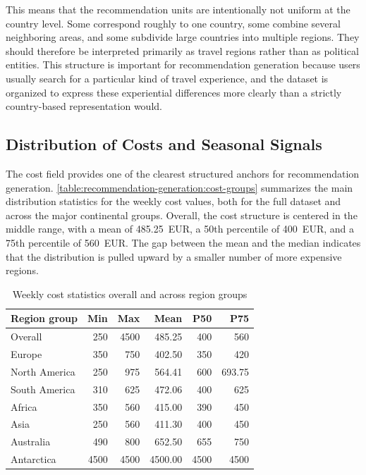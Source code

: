 This means that the recommendation units are intentionally not uniform at the country level. Some correspond roughly to one country, some combine several neighboring areas, and some subdivide large countries into multiple regions. They should therefore be interpreted primarily as travel regions rather than as political entities. This structure is important for recommendation generation because users usually search for a particular kind of travel experience, and the dataset is organized to express these experiential differences more clearly than a strictly country-based representation would.

\subsection{Distribution of Costs and Seasonal Signals}\label{subsection:recommendation-generation:data-grounding:distributions}

The cost field provides one of the clearest structured anchors for recommendation generation. \autoref{table:recommendation-generation:cost-groups} summarizes the main distribution statistics for the weekly cost values, both for the full dataset and across the major continental groups. Overall, the cost structure is centered in the middle range, with a mean of 485.25~EUR, a 50th percentile of 400~EUR, and a 75th percentile of 560~EUR. The gap between the mean and the median indicates that the distribution is pulled upward by a smaller number of more expensive regions.

\begin{table}[htbp]
\centering
\begin{tabular}{lrrrrr}
\hline
Region group & Min & Max & Mean & P50 & P75 \\
\hline
Overall & 250 & 4500 & 485.25 & 400 & 560 \\
Europe & 350 & 750 & 402.50 & 350 & 420 \\
North America & 250 & 975 & 564.41 & 600 & 693.75 \\
South America & 310 & 625 & 472.06 & 400 & 625 \\
Africa & 350 & 560 & 415.00 & 390 & 450 \\
Asia & 250 & 560 & 411.30 & 400 & 450 \\
Australia & 490 & 800 & 652.50 & 655 & 750 \\
Antarctica & 4500 & 4500 & 4500.00 & 4500 & 4500 \\
\hline
\end{tabular}
\caption{Weekly cost statistics overall and across region groups}
\label{table:recommendation-generation:cost-groups}
\end{table}

